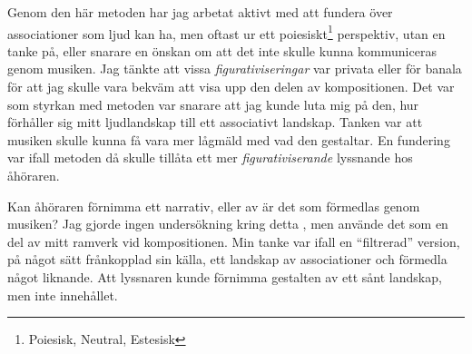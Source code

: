 \documentclass{article}
\begin{document}
Genom den här metoden har jag arbetat aktivt med att fundera över associationer som ljud kan ha, men oftast ur
ett poiesiskt\footnote{Poiesisk, Neutral, Estesisk} perspektiv, utan en tanke på, eller snarare en önskan om
att det inte skulle kunna kommuniceras genom musiken. Jag tänkte att vissa \emph{figurativiseringar} var
privata eller för banala för att jag skulle vara bekväm att visa upp den delen av kompositionen. Det var som
styrkan med metoden var snarare att jag kunde luta mig på den, hur förhåller sig mitt ljudlandskap till ett
associativt landskap. Tanken var att musiken skulle kunna få vara mer lågmäld med vad den gestaltar. En
fundering var ifall metoden då skulle tillåta ett mer \emph{figurativiserande} lyssnande hos åhöraren.

Kan åhöraren förnimma ett narrativ, eller av är det som förmedlas genom musiken? Jag gjorde ingen undersökning
kring detta , men använde det som en del av mitt ramverk vid kompositionen. Min tanke var ifall en
``filtrerad'' version, på något sätt frånkopplad sin källa, ett landskap av associationer och  
förmedla något liknande. Att lyssnaren kunde förnimma gestalten av ett sånt landskap, men inte innehållet. 


\pagebreak

\printbibliography[heading=subbibliography, title={Litteratur}, nottype=music]
\printbibliography[heading=subbibliography, title={Musik}, type=music]
\end{document}
